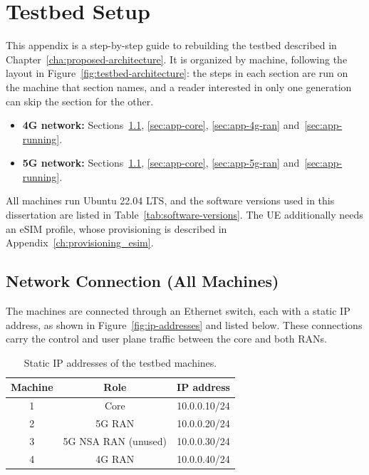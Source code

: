 
%

\chapter{Testbed Setup}
\label{app:testbed-setup}

This appendix is a step-by-step guide to rebuilding the testbed described in Chapter~\ref{cha:proposed-architecture}. It is organized by machine, following the layout in Figure~\ref{fig:testbed-architecture}: the steps in each section are run on the machine that section names, and a reader interested in only one generation can skip the section for the other.

\begin{itemize}
    \item \textbf{4G network:} Sections~\ref{sec:app-network}, \ref{sec:app-core}, \ref{sec:app-4g-ran} and~\ref{sec:app-running}.
    \item \textbf{5G network:} Sections~\ref{sec:app-network}, \ref{sec:app-core}, \ref{sec:app-5g-ran} and~\ref{sec:app-running}.
\end{itemize}

All machines run Ubuntu 22.04 LTS, and the software versions used in this dissertation are listed in Table~\ref{tab:software-versions}. The \gls{UE} additionally needs an eSIM profile, whose provisioning is described in Appendix~\ref{ch:provisioning_esim}.

\section{Network Connection (All Machines)}
\label{sec:app-network}

The machines are connected through an Ethernet switch, each with a static IP address, as shown in Figure~\ref{fig:ip-addresses} and listed below. These connections carry the control and user plane traffic between the core and both \glspl{RAN}.

\begin{table}[htbp]
    \centering
    \begin{tabular}{|c|c|c|}
        \hline
        \textbf{Machine} & \textbf{Role} & \textbf{IP address} \\
        \hline
        1 & Core & 10.0.0.10/24 \\
        \hline
        2 & 5G \gls{RAN} & 10.0.0.20/24 \\
        \hline
        3 & 5G \gls{NSA} \gls{RAN} (unused) & 10.0.0.30/24 \\
        \hline
        4 & 4G \gls{RAN} & 10.0.0.40/24 \\
        \hline
    \end{tabular}
    \caption{Static IP addresses of the testbed machines.}
    \label{tab:app-ip-addresses}
\end{table}

